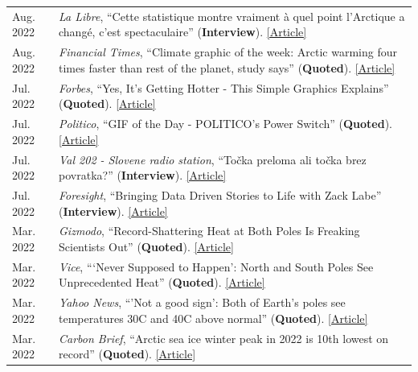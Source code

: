 \documentclass[margin,line,palatino,courier,10pt]{res}
\begin{document}
\begin{resume}
\begin{tabular}{@{}p{0.9in}p{4in}}
Aug. 2022 & \textit{La Libre}, ``Cette statistique montre vraiment \`{a} quel point l'Arctique a chang\'{e}, c'est spectaculaire'' (\textbf{Interview}). \href{https://www.lalibre.be/planete/environnement/2022/08/17/cette-statistique-montre-vraiment-a-quel-point-larctique-a-change-cest-spectaculaire-FGU5ABQZB5F6XINIL5ZBBB3CXM/}{[Article]}\\
Aug. 2022 & \textit{Financial Times}, ``Climate graphic of the week: Arctic warming four times faster than rest of the planet, study says'' (\textbf{Quoted}). \href{https://www.ft.com/content/9bb32c6f-b3dc-46bd-944e-9e583407b866}{[Article]}\\
Jul. 2022 & \textit{Forbes}, ``Yes, It’s Getting Hotter - This Simple Graphics Explains'' (\textbf{Quoted}). \href{https://www.forbes.com/sites/marshallshepherd/2022/07/19/yes-its-getting-hotterthis-simple-graphics-explains/}{[Article]}\\
Jul. 2022 & \textit{Politico}, ``GIF of the Day - POLITICO's Power Switch'' (\textbf{Quoted}). \href{https://www.politico.com/newsletters/power-switch/2022/07/15/time-for-bidens-beast-mode-00046061}{[Article]}\\
Jul. 2022 & \textit{Val 202 - Slovene radio station}, ``To\v{c}ka preloma ali to\v{c}ka brez povratka?'' (\textbf{Interview}). \href{https://val202.rtvslo.si/podkast/vroci-mikrofon/584/174886447}{[Article]}\\
Jul. 2022 & \textit{Foresight}, ``Bringing Data Driven Stories to Life with Zack Labe'' (\textbf{Interview}). \href{https://www.climateforesight.eu/interview/bringing-data-driven-stories-to-life-with-zack-labe/}{[Article]}\\
Mar. 2022 & \textit{Gizmodo}, ``Record-Shattering Heat at Both Poles Is Freaking Scientists Out'' (\textbf{Quoted}). \href{https://gizmodo.com/record-shattering-heat-at-both-poles-is-freaking-scient-1848687193}{[Article]}\\
Mar. 2022 & \textit{Vice}, ```Never Supposed to Happen': North and South Poles See Unprecedented Heat'' (\textbf{Quoted}). \href{https://www.vice.com/en/article/5dg4va/never-supposed-to-happen-north-and-south-poles-see-unprecedented-heat}{[Article]}\\
Mar. 2022 & \textit{Yahoo News}, ``'Not a good sign': Both of Earth’s poles see temperatures 30C and 40C above normal'' (\textbf{Quoted}). \href{https://news.yahoo.com/not-a-good-sign-both-of-earths-poles-see-temperatures-30-c-and-40-c-above-normal-155815110.html}{[Article]}\\
Mar. 2022 & \textit{Carbon Brief}, ``Arctic sea ice winter peak in 2022 is 10th lowest on record'' (\textbf{Quoted}). \href{https://www.carbonbrief.org/arctic-sea-ice-winter-peak-in-2022-is-10th-lowest-on-record}{[Article]}\\

\end{tabular}
\end{resume}
\end{document}
